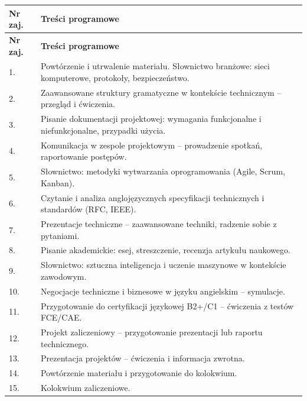 \documentclass[12pt, a4paper]{article}
\newcommand{\thdrule}{\noalign{\global\setlength{\extrarowheight}{0pt}}}
\newcommand{\thdend}{\noalign{\global\setlength{\extrarowheight}{3pt}}}
\begin{document}
{\scriptsize
\begin{longtable}{m{1.5cm}m{14.5cm}}
\thdrule\toprule
\rowcolor{pjatkRed} {\color{white}\textbf{Nr zaj.}} & {\color{white}\textbf{Treści programowe}} \\
\midrule\thdend
\endfirsthead
\thdrule\toprule
\rowcolor{pjatkRed} {\color{white}\textbf{Nr zaj.}} & {\color{white}\textbf{Treści programowe}} \\
\midrule\thdend
\endhead
  \rowcolor{tableRowLight} 1. & Powtórzenie i utrwalenie materiału. Słownictwo branżowe: sieci komputerowe, protokoły, bezpieczeństwo. \\
  \rowcolor{tableRowAlt} 2. & Zaawansowane struktury gramatyczne w kontekście technicznym – przegląd i ćwiczenia. \\
  \rowcolor{tableRowLight} 3. & Pisanie dokumentacji projektowej: wymagania funkcjonalne i niefunkcjonalne, przypadki użycia. \\
  \rowcolor{tableRowAlt} 4. & Komunikacja w zespole projektowym – prowadzenie spotkań, raportowanie postępów. \\
  \rowcolor{tableRowLight} 5. & Słownictwo: metodyki wytwarzania oprogramowania (Agile, Scrum, Kanban). \\
  \rowcolor{tableRowAlt} 6. & Czytanie i analiza anglojęzycznych specyfikacji technicznych i standardów (RFC, IEEE). \\
  \rowcolor{tableRowLight} 7. & Prezentacje techniczne – zaawansowane techniki, radzenie sobie z pytaniami. \\
  \rowcolor{tableRowAlt} 8. & Pisanie akademickie: esej, streszczenie, recenzja artykułu naukowego. \\
  \rowcolor{tableRowLight} 9. & Słownictwo: sztuczna inteligencja i uczenie maszynowe w kontekście zawodowym. \\
  \rowcolor{tableRowAlt} 10. & Negocjacje techniczne i biznesowe w języku angielskim – symulacje. \\
  \rowcolor{tableRowLight} 11. & Przygotowanie do certyfikacji językowej B2+/C1 – ćwiczenia z testów FCE/CAE. \\
  \rowcolor{tableRowAlt} 12. & Projekt zaliczeniowy – przygotowanie prezentacji lub raportu technicznego. \\
  \rowcolor{tableRowLight} 13. & Prezentacja projektów – ćwiczenia i informacja zwrotna. \\
  \rowcolor{tableRowAlt} 14. & Powtórzenie materiału i przygotowanie do kolokwium. \\
  \rowcolor{tableRowLight} 15. & Kolokwium zaliczeniowe. \\
\bottomrule
\end{longtable}}
\end{document}
